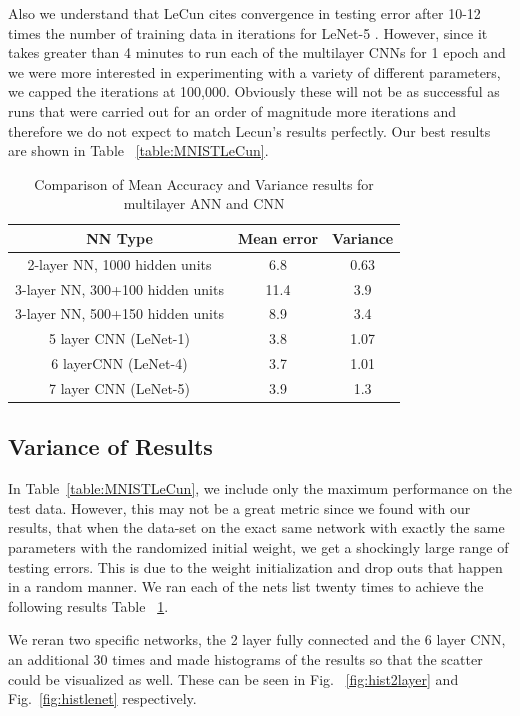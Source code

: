 \documentclass[12pt, twocolumn]{article}
\begin{document}
Also we understand that LeCun cites convergence in testing error after 10-12 times the number of training data in iterations for LeNet-5 \cite{LeCun1998}. However, since it takes greater than 4 minutes to run each of the multilayer CNNs for 1 epoch and we were more interested in experimenting with a variety of different parameters, we capped the iterations at 100,000. Obviously these will not be as successful as runs that were carried out for an order of magnitude more iterations and therefore we do not expect to match Lecun's results perfectly.  Our best results are shown in Table ~\ref{table:MNISTLeCun}. 

\begin{table}
	\begin{center}
		\begin{tabular} { |c | c | c | }
			\hline
			NN Type & Mean error &   Variance\\ \hline
			2-layer NN, 1000 hidden units & 6.8  & 0.63\\ \hline
			3-layer NN, 300+100 hidden units & 11.4  & 3.9 \\ \hline
			3-layer NN, 500+150 hidden units & 8.9  & 3.4\\ \hline
			5 layer CNN  (LeNet-1) & 3.8  & 1.07 \\ \hline 
			6 layerCNN (LeNet-4) & 3.7 & 1.01\\ \hline 
			7 layer CNN (LeNet-5) &  3.9  &1.3\\ \hline
		\end{tabular}		
		\caption{Comparison of Mean Accuracy and Variance results for multilayer ANN and CNN}
		\label{table:variance}
	\end{center}
\end{table}

\subsection{Variance of Results}
In Table~\ref{table:MNISTLeCun}, we include only the maximum performance on the test data. However, this may not be a great metric since we found with our results, that when the data-set on the exact same network with exactly the same parameters with the randomized initial weight, we get a shockingly large range of testing errors. This is due to the weight initialization and drop outs that happen in a random manner. We ran each of the nets list twenty times  to achieve the following results Table ~\ref{table:variance}. 

We reran two specific networks, the 2 layer fully connected and the 6 layer CNN, an additional 30 times and made histograms of the results so that the scatter could be visualized as well. These can be seen in Fig. ~\ref{fig:hist2layer} and Fig.~\ref{fig:histlenet} respectively. 
\end{document}
